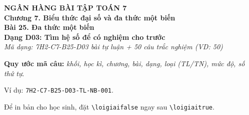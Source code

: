 \documentclass[12pt,a4paper]{article}
\newif\ifloigiai
\begin{document}
\begin{center}
{\Large\textbf{NGÂN HÀNG BÀI TẬP TOÁN 7}}\\[3pt]
\textbf{Chương 7. Biểu thức đại số và đa thức một biến}\\[2pt]
\textbf{Bài 25. Đa thức một biến}\\[2pt]
\textbf{Dạng D03: Tìm hệ số để có nghiệm cho trước}\\[2pt]
\textit{Mã dạng: 7H2-C7-B25-D03  bài tự luận + 50 câu trắc nghiệm \quad (VD: 50)}
\end{center}
\textbf{Quy ước mã câu:} \textit{khối, học kì, chương, bài, dạng, loại (TL/TN), mức độ, số thứ tự}.\par Ví dụ: \texttt{7H2-C7-B25-D03-TL-NB-001}.\par Để in bản cho học sinh, đặt \verb|\loigiaifalse| ngay sau \verb|\loigiaitrue|.
\end{document}
